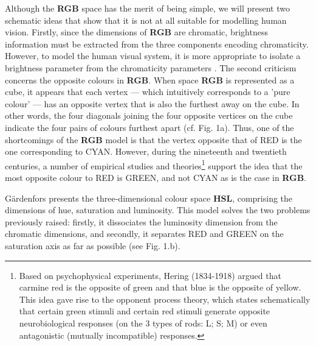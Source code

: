 \documentclass{article}
\begin{document}
Although the \textbf{RGB} space has the merit of being simple, we will present two schematic ideas that show that it is not at all suitable for modelling human vision. Firstly, since the dimensions of \textbf{RGB} are chromatic, brightness information must be extracted from the three components encoding chromaticity. However, to model the human visual system, it is more appropriate to isolate a brightness parameter from the chromaticity parameters \cite[p.78]{fairchild2013}. The second criticism concerns the opposite colours in \textbf{RGB}. When space \textbf{RGB} is represented as a cube, it appears that each vertex — which intuitively corresponds to a 'pure colour' — has an opposite vertex that is also the furthest away on the cube. In other words, the four diagonals joining the four opposite vertices on the cube indicate the four pairs of colours furthest apart (cf. Fig. 1a). Thus, one of the shortcomings of the \textbf{RGB} model is that the vertex opposite that of RED is the one corresponding to CYAN. However, during the nineteenth and twentieth centuries, a number of empirical studies and theories\footnote{Based on psychophysical experiments, Hering (1834-1918) argued that carmine red is the opposite of green and that blue is the opposite of yellow. This idea gave rise to the opponent process theory, which states schematically that certain green stimuli and certain red stimuli generate opposite neurobiological responses (on the 3 types of rods: L; S; M) or even antagonistic (mutually incompatible) responses.} support the idea that the most opposite colour to RED is GREEN, and not CYAN as is the case in \textbf{RGB}.

Gärdenfors \cite[section 2.1]{gardenfors2014} presents the three-dimensional colour space \textbf{HSL}, comprising the dimensions of hue, saturation and luminosity. This model solves the two problems previously raised: firstly, it dissociates the luminosity dimension from the chromatic dimensions, and secondly, it separates RED and GREEN on the saturation axis as far as possible (see Fig. 1.b).
\end{document}
